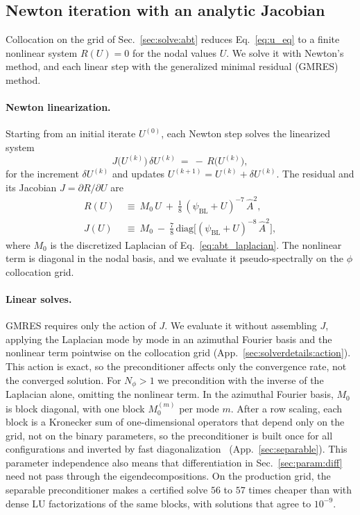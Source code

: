 \documentclass[
  aps,
  prd,
  twocolumn,
  10pt,
  amsmath,
  amssymb,
  nofootinbib,
  superscriptaddress,
  floatfix,
]{revtex4-2}
\newcommand{\psiBL}{\psi_{\mathrm{BL}}}
\newcommand{\Ahat}{\hat{A}}
\begin{document}
\subsection{Newton iteration with an analytic Jacobian}
\label{sec:solve:newton}

Collocation on the grid of Sec.~\ref{sec:solve:abt} reduces
Eq.~\eqref{eq:u_eq} to a finite nonlinear system $R(U)=0$ for the nodal values $U$.
We solve it with Newton's method, and each linear step with the generalized minimal residual
(GMRES) method.

\paragraph{Newton linearization.}
Starting from an initial iterate $U^{(0)}$, each Newton step solves the
linearized system
\begin{equation}
  J\bigl(U^{(k)}\bigr)\,\delta U^{(k)} \ = \ -\,R\bigl(U^{(k)}\bigr),
  \label{eq:newton}
\end{equation}
for the increment $\delta U^{(k)}$ and updates
$U^{(k+1)} = U^{(k)} + \delta U^{(k)}$.
The residual and its Jacobian $J = \partial{R} / \partial U$ are
\begin{align}
  R(U) \ &\equiv \ M_0\,U \ + \ \tfrac{1}{8}\,(\psiBL+U)^{-7}\,\Ahat^2,
  \label{eq:residual}
  \\
  J(U) \ &\equiv \ M_0 \ - \ \tfrac{7}{8}\,\mathrm{diag}\!\big[(\psiBL+U)^{-8}\,\Ahat^2\big],
  \label{eq:jacobian}
\end{align}
where $M_0$ is the discretized Laplacian of Eq.~\eqref{eq:abt_laplacian}.
The nonlinear term is diagonal in the nodal basis, and we evaluate it pseudo-spectrally on the $\phi$
collocation grid.

\paragraph{Linear solves.}
GMRES requires only the action of $J$. We evaluate it without assembling $J$, applying the Laplacian mode by mode in an azimuthal Fourier basis and the nonlinear term pointwise on the collocation grid (App.~\ref{sec:solverdetails:action}).
This action is exact, so the preconditioner affects only the convergence rate, not the converged solution.
For $N_\phi>1$ we precondition with the inverse of the Laplacian alone, omitting the nonlinear term.
In the azimuthal Fourier basis, $M_0$ is block diagonal, with one block $M_0^{(m)}$ per mode $m$.
After a row scaling, each block is a Kronecker sum of one-dimensional operators that depend only on the grid, not on the binary parameters, so the preconditioner is built once for all configurations and inverted by fast diagonalization~\cite{Lynch1964} (App.~\ref{sec:separable}).
This parameter independence also means that differentiation in Sec.~\ref{sec:param:diff} need not pass through the eigendecompositions.
On the production grid, the separable preconditioner makes a certified solve $56$ to $57$ times cheaper than with dense LU factorizations of the same blocks, with solutions that agree to $10^{-9}$.
\end{document}
